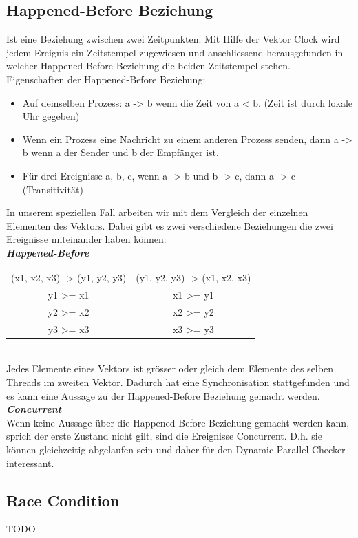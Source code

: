 \documentclass[10pt,a4paper]{article}
\begin{document}
\subsection{Happened-Before Beziehung}
\begin{flushleft}
Ist eine Beziehung zwischen zwei Zeitpunkten. Mit Hilfe der Vektor Clock wird jedem Ereignis ein Zeitstempel zugewiesen und anschliessend herausgefunden in welcher Happened-Before Beziehung die beiden Zeitstempel stehen.\\
Eigenschaften der Happened-Before Beziehung:
\begin{itemize}
\item Auf demselben Prozess: a -> b wenn die Zeit von a < b. (Zeit ist durch lokale Uhr gegeben)
\item Wenn ein Prozess eine Nachricht zu einem anderen Prozess senden, dann a -> b wenn a der Sender und b der Empfänger ist.
\item Für drei Ereignisse a, b, c, wenn a -> b und b -> c, dann a -> c (Transitivität)
\end{itemize}
In unserem speziellen Fall arbeiten wir mit dem Vergleich der einzelnen Elementen des Vektors. Dabei gibt es zwei verschiedene Beziehungen die zwei Ereignisse miteinander haben können:\\
\textit{\textbf{Happened-Before}\\[0.2cm]}
\begin{tabular}{ c c }
  (x1, x2, x3) -> (y1, y2, y3) & (y1, y2, y3) -> (x1, x2, x3) \\
  y1 >= x1 & x1 >= y1 \\
  y2 >= x2 & x2 >= y2 \\
  y3 >= x3 & x3 >= y3 \\[0.2cm]
\end{tabular}
\\Jedes Elemente eines Vektors ist grösser oder gleich dem Elemente des selben Threads im zweiten Vektor. Dadurch hat eine Synchronisation stattgefunden und es kann eine Aussage zu der Happened-Before Beziehung gemacht werden.\\
\textit{\textbf{Concurrent}\\}
Wenn keine Aussage über die Happened-Before Beziehung gemacht werden kann, sprich der erste Zustand nicht gilt, sind die Ereignisse Concurrent. D.h. sie können gleichzeitig abgelaufen sein und daher für den Dynamic Parallel Checker interessant.\\
\end{flushleft}
\newpage
\subsection{Race Condition}
\begin{flushleft}
TODO
\end{flushleft}
\newpage
\end{document}
